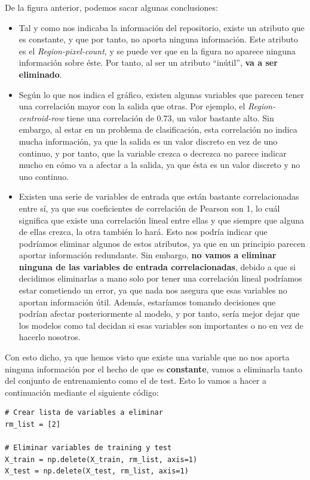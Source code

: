 \documentclass[11pt,a4paper]{article}
\begin{document}
De la figura anterior, podemos sacar algunas conclusiones:

\begin{itemize}[label=\textbullet]
    \item Tal y como nos indicaba la información del repositorio, existe un atributo que es constante, y que por tanto, no aporta
    ninguna información. Este atributo es el \textit{Region-pixel-count}, y se puede ver que en la figura no aparece ninguna
    información sobre éste. Por tanto, al ser un atributo ``inútil'', \textbf{va a ser eliminado}.
    \item Según lo que nos indica el gráfico, existen algunas variables que parecen tener una correlación mayor con la salida que
    otras. Por ejemplo, el \textit{Region-centroid-row} tiene una correlación de 0.73, un valor bastante alto. Sin embargo, al estar
    en un problema de clasificación, esta correlación no indica mucha información, ya que la salida es un valor discreto en vez de
    uno continuo, y por tanto, que la variable crezca o decrezca no parece indicar mucho en cómo va a afectar a la salida, ya que ésta
    es un valor discreto y no uno continuo.
    \item Existen una serie de variables de entrada que están bastante correlacionadas entre sí, ya que sus coeficientes de correlación de
    Pearson son 1, lo cuál significa que existe una correlación lineal entre ellas y que siempre que alguna de ellas crezca, la otra también
    lo hará. Esto nos podría indicar que podríamos eliminar algunos de estos atributos, ya que en un principio parecen aportar información
    redundante. Sin embargo, \textbf{no vamos a eliminar ninguna de las variables de entrada correlacionadas}, debido a que si decidimos
    eliminarlas a mano solo por tener una correlación lineal podríamos estar cometiendo un error, ya que nada nos asegura que esas variables
    no aportan información útil. Además, estaríamos tomando decisiones que podrían afectar posteriormente al modelo, y por tanto, sería
    mejor dejar que los modelos como tal decidan si esas variables son importantes o no en vez de hacerlo nosotros.
\end{itemize}

Con esto dicho, ya que hemos visto que existe una variable que no nos aporta ninguna información por el hecho de que es \textbf{constante}, vamos
a eliminarla tanto del conjunto de entrenamiento como el de test. Esto lo vamos a hacer a continuación mediante el siguiente código:

\begin{lstlisting}
# Crear lista de variables a eliminar
rm_list = [2]

# Eliminar variables de training y test
X_train = np.delete(X_train, rm_list, axis=1)
X_test = np.delete(X_test, rm_list, axis=1)
\end{lstlisting}
\end{document}
